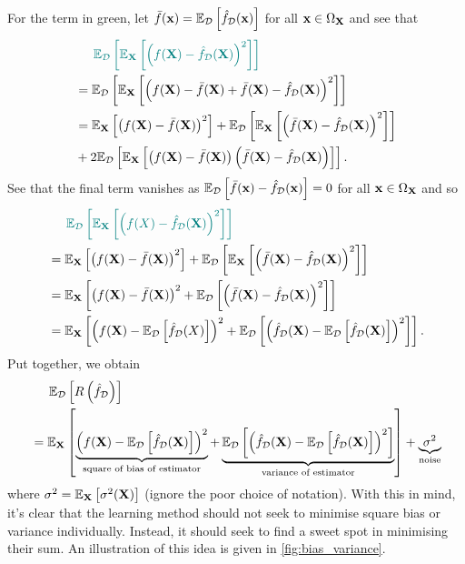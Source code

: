 \documentclass[11pt]{article}
\begin{document}
For the term in green, let $\bar{f}(\mathbf{x})=\mathbb{E}_{\mathcal{D}}\left[\hat{f}_{\mathcal{D}}(\mathbf{x})\right]$ for all $\mathbf{x}\in\Omega_{\mathbf{X}}$ and see that
\begin{align*}
    &\hspace{14.52pt}
    \textcolor{myGreen}{\E_{\D}\l[\E_\X\l[\l(f(\X)-\hat{f}_{\D}(\X)\r)^2\r]\r]}\\
    &=
    \E_{\D}\l[\E_\X\l[\l(f(\X)-\bar{f}(\X)+\bar{f}(\X)-\hat{f}_{\D}(\X)\r)^2\r]\r]\\
    &=
    \E_\X\l[\l(f(\X)-\bar{f}(\X)\r)^2\r]+\E_{\D}\l[\E_\X\l[\l(\bar{f}(\X)-\hat{f}_{\D}(\X)\r)^2\r]\r]\\
    &+
    2\E_{\D}\l[\E_\X\l[\l(f(\X)-\bar{f}(\X)\r)\l(\bar{f}(\X)-\hat{f}_{\D}(\X)\r)\r]\r].
\end{align*}
See that the final term vanishes as $\mathbb{E}_{\mathcal{D}}\left[\bar{f}(\mathbf{x})-\hat{f}_{\mathcal{D}}(\mathbf{x})\right]=0$ for all $\mathbf{x}\in\Omega_{\mathbf{X}}$ and so
\begin{align*}
    &\hspace{14.52pt}
    \textcolor{myGreen}{\E_{\D}\l[\E_\X\l[\l(f(X)-\hat{f}_{\D}(\X)\r)^2\r]\r]}\\
    &=
    \E_\X\l[\l(f(\X)-\bar{f}(\X)\r)^2\r]+\E_{\D}\l[\E_\X\l[\l(\bar{f}(\X)-\hat{f}_{\D}(\X)\r)^2\r]\r]\\
    &=
    \E_\X\l[\l(f(\X)-\bar{f}(\X)\r)^2+\E_{\D}\l[\l(\bar{f}(\X)-\hat{f}_{\D}(\X)\r)^2\r]\r]\\
    &=
    \E_\X\l[\l(f(\X)-\E_{\D}\l[\hat{f}_{\D}(X)\r]\r)^2+\E_{\D}\l[\l(\hat{f}_{\D}(\X)-\E_{\D}\l[\hat{f}_{\D}(\X)\r]\r)^2\r]\r].
\end{align*}
Put together, we obtain
\begin{align*}
    &\hspace{14.52pt}
    \mathbb{E}_{\mathcal{D}}\left[R\left(\hat{f}_{\mathcal{D}}\right)\right]\\
    &=
    \mathbb{E}_{\mathbf{X}}\left[\underbrace{\left(f(\mathbf{X})-\mathbb{E}_{\mathcal{D}}\left[\hat{f}_{\mathcal{D}}(\mathbf{X})\right]\right)^2}_{\text{square of bias of estimator}}+\underbrace{\mathbb{E}_{\mathcal{D}}\left[\left(\hat{f}_{\mathcal{D}}(\mathbf{X})-\mathbb{E}_{\mathcal{D}}\left[\hat{f}_{\mathcal{D}}(\mathbf{X})\right]\right)^2\right]}_{\text{variance of estimator}}\right]+\underbrace{\sigma^2}_{\text{noise}}
\end{align*}
where $\sigma^2=\mathbb{E}_{\mathbf{X}}\left[\sigma^2(\mathbf{X})\right]$ (ignore the poor choice of notation). With this in mind, it's clear that the learning method should not seek to minimise square bias or variance individually. Instead, it should seek to find a sweet spot in minimising their sum. An illustration of this idea is given in \autoref{fig:bias_variance}.
\end{document}
